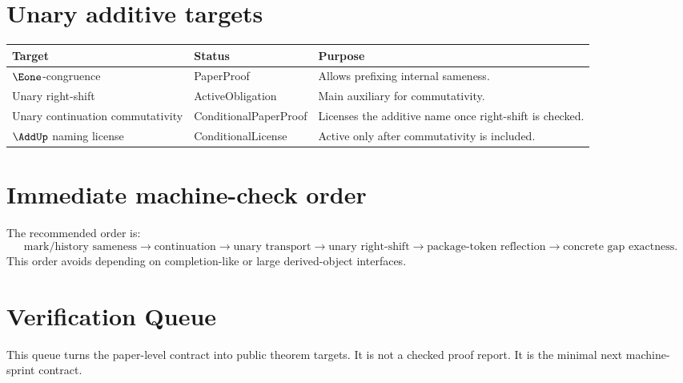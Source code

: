 \section{Unary additive targets}
\begin{longtable}{p{}p{}p{}}
\toprule
\textbf{Target} & \textbf{Status} & \textbf{Purpose}\\
\midrule
\(\Eone\)-congruence & PaperProof & Allows prefixing internal sameness.\\
Unary right-shift & ActiveObligation & Main auxiliary for commutativity.\\
Unary continuation commutativity & ConditionalPaperProof & Licenses the additive name once right-shift is checked.\\
\(\AddUp\) naming license & ConditionalLicense & Active only after commutativity is included.\\
\bottomrule
\end{longtable}

\section{Immediate machine-check order}
The recommended order is:
\[
\text{mark/history sameness}
\to
\text{continuation}
\to
\text{unary transport}
\to
\text{unary right-shift}
\to
\text{package-token reflection}
\to
\text{concrete gap exactness}.
\]
This order avoids depending on completion-like or large derived-object interfaces.

\section{Verification Queue}
\label{sec:po-verification-queue}

This queue turns the paper-level contract into public theorem targets. It is not a checked proof report. It is the minimal next machine-sprint contract.

